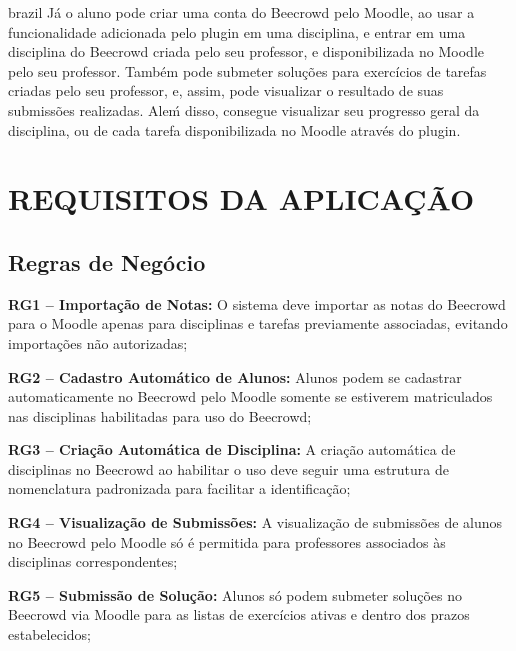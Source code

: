 \begin{otherlanguage*}{brazil}
Já o aluno pode criar uma conta do Beecrowd pelo Moodle, ao usar a funcionalidade adicionada pelo plugin em uma disciplina, e entrar em uma disciplina do Beecrowd criada pelo seu professor, e disponibilizada no Moodle pelo seu professor. Também pode submeter soluções para exercícios de tarefas criadas pelo seu professor, e, assim, pode visualizar o resultado de suas submissões realizadas. Aleḿ disso, consegue visualizar seu progresso geral da disciplina, ou de cada tarefa disponibilizada no Moodle através do plugin.

\section{REQUISITOS DA APLICAÇÃO}

\subsection{Regras de Negócio}

\textbf{RG1 – Importação de Notas:} O sistema deve importar as notas do Beecrowd para o Moodle apenas para disciplinas e tarefas previamente associadas, evitando importações não autorizadas;

\vspace{12pt}

\textbf{RG2 – Cadastro Automático de Alunos:} Alunos podem se cadastrar automaticamente no Beecrowd pelo Moodle somente se estiverem matriculados nas disciplinas habilitadas para uso do Beecrowd;

\vspace{12pt}

\textbf{RG3 – Criação Automática de Disciplina:} A criação automática de disciplinas no Beecrowd ao habilitar o uso deve seguir uma estrutura de nomenclatura padronizada para facilitar a identificação;

\vspace{12pt}

\textbf{RG4 – Visualização de Submissões:} A visualização de submissões de alunos no Beecrowd pelo Moodle só é permitida para professores associados às disciplinas correspondentes;

\vspace{12pt}

\textbf{RG5 – Submissão de Solução:} Alunos só podem submeter soluções no Beecrowd via Moodle para as listas de exercícios ativas e dentro dos prazos estabelecidos;

\vspace{12pt}


\end{otherlanguage*}
